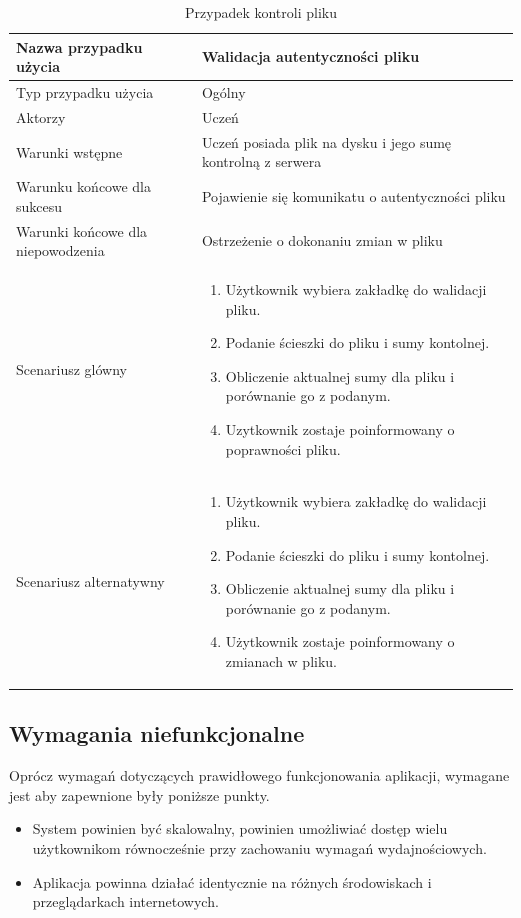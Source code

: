 \begin{table}[H]
    \centering
    \begin{tabular}{|l<{\raggedright}|p{3in}|}
    \hline
    Nazwa przypadku użycia & Walidacja autentyczności pliku  \\ \hline
    Typ przypadku użycia  & Ogólny  \\ \hline
    Aktorzy   & Uczeń    \\ \hline
    Warunki wstępne   & Uczeń posiada plik na dysku i jego sumę kontrolną z serwera    \\ \hline
    Warunku końcowe dla sukcesu   & Pojawienie się komunikatu o autentyczności pliku    \\ \hline
    Warunki końcowe dla niepowodzenia   & Ostrzeżenie o dokonaniu zmian w pliku     \\ \hline
   Scenariusz glówny   &

    \begin{enumerate}
    \itemsep0em
        \item Użytkownik wybiera zakładkę do walidacji pliku.
        \item Podanie ścieszki do pliku i sumy kontolnej.
        \item Obliczenie aktualnej sumy dla pliku i porównanie go z podanym.
        \item Uzytkownik zostaje poinformowany o poprawności pliku.
    \end{enumerate}
     \\ \hline
    Scenariusz alternatywny   &

    \begin{enumerate}
    \itemsep0em
        \item Użytkownik wybiera zakładkę do walidacji pliku.
        \item Podanie ścieszki do pliku i sumy kontolnej.
        \item Obliczenie aktualnej sumy dla pliku i porównanie go z podanym.
        \item Użytkownik zostaje poinformowany o zmianach w pliku.
    \end{enumerate}
         \\ \hline
    \end{tabular}
    \caption{Przypadek kontroli pliku}
    \label{tab:caseuse2}
\end{table}

\subsection{Wymagania niefunkcjonalne}
\label{sec:niefunkcjonalnes}

Oprócz wymagań dotyczących prawidłowego funkcjonowania aplikacji, wymagane jest
aby zapewnione były poniższe punkty.

\begin{itemize}
\item
System powinien być skalowalny, powinien umożliwiać dostęp wielu użytkownikom równocześnie przy zachowaniu wymagań wydajnościowych.

\item
Aplikacja powinna działać identycznie na różnych środowiskach i przeglądarkach internetowych.
\end{itemize}
